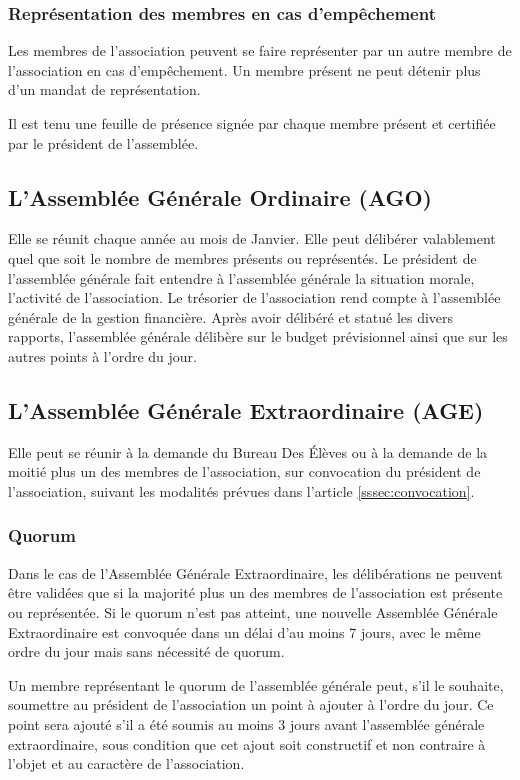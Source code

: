 \documentclass{article} %
\begin{document}
			\subsubsection{Représentation des membres en cas d’empêchement}
				Les membres de l’association peuvent se faire représenter par un
				autre membre de l’association en cas d’empêchement. Un membre présent
				ne peut détenir plus d’un mandat de représentation.

				Il est tenu une feuille de présence signée par chaque membre présent
				et certifiée par le président de l’assemblée.

		\subsection{L’Assemblée Générale Ordinaire (AGO)}
			Elle se réunit chaque année au mois de Janvier. Elle peut délibérer
			valablement quel que soit le nombre de membres présents ou représentés.
			Le président de l’assemblée générale fait entendre à l’assemblée générale
			la situation morale, l’activité de l’association. Le trésorier de
			l’association rend compte à l’assemblée générale de la gestion
			financière. Après avoir délibéré et statué les divers rapports,
			l’assemblée générale délibère sur le budget prévisionnel ainsi que sur
			les autres points à l’ordre du jour. 

		\subsection{L’Assemblée Générale Extraordinaire (AGE)}
			Elle peut se réunir à la demande du Bureau Des Élèves ou à la demande de
			la moitié plus un des membres de l’association, sur convocation du
			président de l’association, suivant les modalités prévues dans l’article
			\ref{sssec:convocation}.

			\subsubsection{Quorum}
				Dans le cas de l’Assemblée Générale Extraordinaire, les délibérations
				ne peuvent être validées que si la majorité plus un
				des membres de l’association est présente ou représentée. Si le
				quorum n’est pas atteint, une nouvelle Assemblée Générale
				Extraordinaire
				est convoquée dans un délai d’au moins 7 jours, avec le même ordre du
				jour mais sans nécessité de quorum.

				Un membre représentant le quorum de l’assemblée générale peut, s’il
				le souhaite, soumettre au président de l’association un point à
				ajouter à l’ordre du jour. Ce point sera ajouté s’il a été
				soumis au moins 3 jours avant l’assemblée générale
				extraordinaire, sous condition que cet ajout soit constructif et
				non contraire à l'objet et au caractère de l’association.
\end{document}
